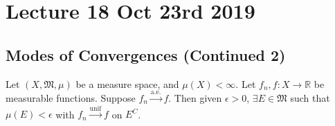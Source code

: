 \documentclass[notoc,notitlepage]{tufte-book}
\newcommand{\convae}{\overset{\text{a.e.}}{\to}}
\newcommand{\convunif}{\overset{\text{unif}}{\to}}
\begin{document}


\chapter{Lecture 18 Oct 23rd 2019}%
\label{chp:lecture_18_oct_23rd_2019}

\section{Modes of Convergences (Continued 2)}%
\label{sec:modes_of_convergences_continued_2}

\begin{thm}\label{thm:egoroff_s_theorem}
  Let $(X ,\mathfrak{M}, \mu)$ be a measure space, and $\mu(X) < \infty$.
  Let $f_n, f : X \to \mathbb{R}$ be measurable functions.
  Suppose $f_n \convae f$. Then given $\epsilon > 0$,
  $\exists E \in \mathfrak{M}$ such that $\mu(E) < \epsilon$
  with $f_n \convunif f$ on $E^C$.
\end{thm}
\end{document}
